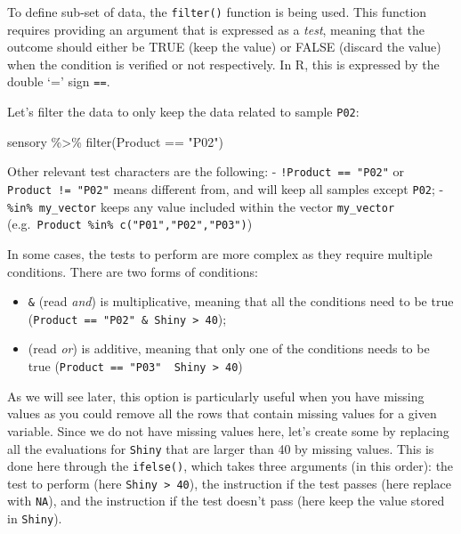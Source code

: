 \documentclass[
]{book}
\newenvironment{Shaded}{\begin{snugshade}}{\end{snugshade}}
\newcommand{\FunctionTok}[1]{\textcolor[rgb]{0.00,0.00,0.00}{#1}}
\newcommand{\NormalTok}[1]{#1}
\newcommand{\SpecialCharTok}[1]{\textcolor[rgb]{0.00,0.00,0.00}{#1}}
\newcommand{\StringTok}[1]{\textcolor[rgb]{0.31,0.60,0.02}{#1}}
\providecommand{\tightlist}{%
  \setlength{\itemsep}{0pt}\setlength{\parskip}{0pt}}
\begin{document}
To define sub-set of data, the \texttt{filter()} function is being used. This function requires providing an argument that is expressed as a \emph{test}, meaning that the outcome should either be TRUE (keep the value) or FALSE (discard the value) when the condition is verified or not respectively. In R, this is expressed by the double `=' sign \texttt{==}.

Let's filter the data to only keep the data related to sample \texttt{P02}:

\begin{Shaded}
\begin{Highlighting}[]
\NormalTok{sensory }\SpecialCharTok{\%\textgreater{}\%} 
  \FunctionTok{filter}\NormalTok{(Product }\SpecialCharTok{==} \StringTok{"P02"}\NormalTok{)}
\end{Highlighting}
\end{Shaded}

Other relevant test characters are the following:
- \texttt{!Product\ ==\ "P02"} or \texttt{Product\ !=\ "P02"} means different from, and will keep all samples except \texttt{P02};
- \texttt{\%in\%\ my\_vector} keeps any value included within the vector \texttt{my\_vector} (e.g.~\texttt{Product\ \%in\%\ c("P01","P02","P03")})

In some cases, the tests to perform are more complex as they require multiple conditions.
There are two forms of conditions:

\begin{itemize}
\tightlist
\item
  \texttt{\&} (read \emph{and}) is multiplicative, meaning that all the conditions need to be true (\texttt{Product\ ==\ "P02"\ \&\ Shiny\ \textgreater{}\ 40});
\item
  \texttt{\textbar{}} (read \emph{or}) is additive, meaning that only one of the conditions needs to be true (\texttt{Product\ ==\ "P03"\ \textbar{}\ Shiny\ \textgreater{}\ 40})
\end{itemize}

As we will see later, this option is particularly useful when you have missing values as you could remove all the rows that contain missing values for a given variable. Since we do not have missing values here, let's create some by replacing all the evaluations for \texttt{Shiny} that are larger than 40 by missing values. This is done here through the \texttt{ifelse()}, which takes three arguments (in this order): the test to perform (here \texttt{Shiny\ \textgreater{}\ 40}), the instruction if the test passes (here replace with \texttt{NA}), and the instruction if the test doesn't pass (here keep the value stored in \texttt{Shiny}).
\end{document}
